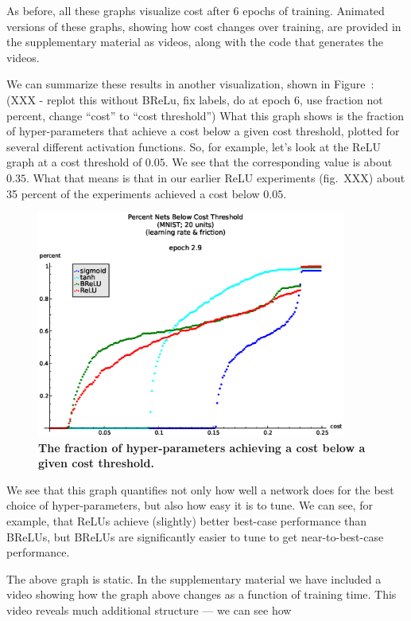 \documentclass[10pt]{article}
\begin{document}
As before, all these graphs visualize cost after 6 epochs of
training. Animated versions of these graphs, showing how cost changes
over training, are provided in the supplementary material as videos,
along with the code that generates the videos.

We can summarize these results in another visualization, shown in
Figure~\label{fig:fraction}: (XXX - replot this without BReLu, fix
labels, do at epoch 6, use fraction not percent, change ``cost'' to
``cost threshold'') What this graph shows is the fraction of
hyper-parameters that achieve a cost below a given cost threshold,
plotted for several different activation functions.  So, for example,
let's look at the ReLU graph at a cost threshold of $0.05$.  We see
that the corresponding value is about $0.35$.  What that means is that
in our earlier ReLU experiments (fig.~XXX) about 35 percent of the
experiments achieved a cost below $0.05$.

\begin{figure}[!ht]
\begin{center}
\includegraphics[width=4in]{plots/detailed/LF-20a10a-20T10-MNIST-3-percent.eps}
\end{center}
\caption{ {\bf The fraction of hyper-parameters achieving a cost below
    a given cost threshold.}}
\label{fig:fraction}
\end{figure}

We see that this graph quantifies not only how well a network does for
the best choice of hyper-parameters, but also how easy it is to tune.
We can see, for example, that ReLUs achieve (slightly) better
best-case performance than BReLUs, but BReLUs are significantly easier
to tune to get near-to-best-case performance.

The above graph is static.  In the supplementary material we have
included a video showing how the graph above changes as a function of
training time.  This video reveals much additional structure --- we
can see how
\end{document}
